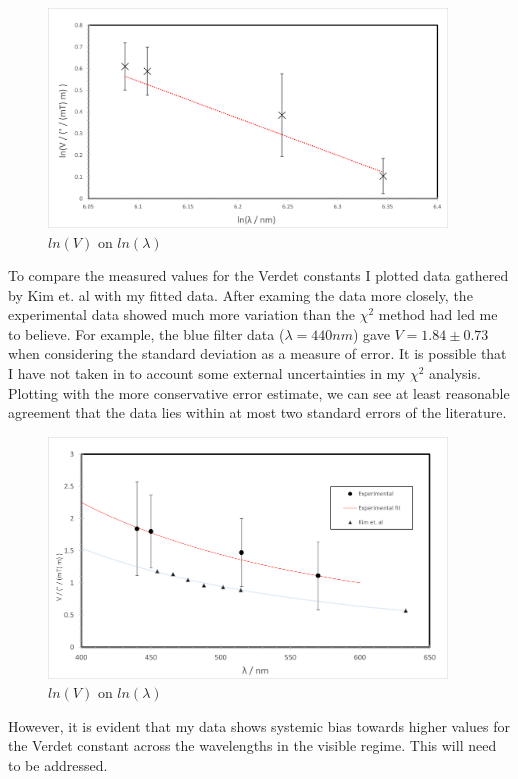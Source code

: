 \documentclass{article}%
\begin{document}
\begin{figure}[H]%
    \centering%
    \includegraphics[width=400px]{verdet.png}%
    \caption{$ln(V)$ on $ln(\lambda)$}%
\end{figure}

To compare the measured values for the Verdet constants I plotted data gathered by Kim et. al \cite{Kim} with my fitted data. 
After examing the data more closely, the experimental data showed much more variation than the $\chi^2$ method had led me to believe. For example, the blue filter data ($\lambda=440nm$) gave $V=1.84\pm0.73$ when considering the standard deviation as a measure of error.
It is possible that I have not taken in to account some external uncertainties in my $\chi^{2}$ analysis. Plotting with the more conservative error estimate, we can see at least reasonable agreement that the data lies within at most two standard errors of the literature.

\begin{figure}[H]%
    \centering%
    \includegraphics[width=400px]{theoretical.png}%
    \caption{$ln(V)$ on $ln(\lambda)$}%
\end{figure}


However, it is evident that my data shows systemic bias towards higher values for the Verdet constant across the wavelengths in the visible regime. This will need to be addressed.
\end{document}
